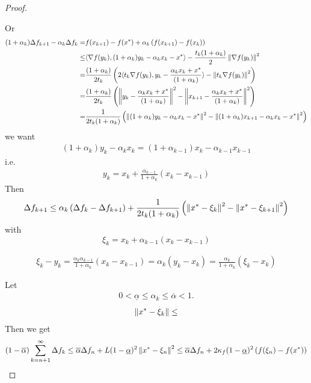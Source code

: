 \documentclass[english,12pt,a4paper]{article}
\begin{document}
\begin{proof}
%
\begin{blueenv}
%
Or 
%
\begin{align*}
(1+\alpha_k) \Delta f_{k+1} -\alpha_k \Delta f_{k} =& f(x_{k+1})-f(x^*) + \alpha_k\left(  f(x_{k+1})-f(x_{k})\right)\\
\le& \langle\nabla f(y_k),(1+\alpha_k) y_{k}-\alpha_k x_k -x^*\rangle - \frac{t_k(1+\alpha_k)}{2} \left\|\nabla f(y_k)\right\|^2 \\
=& \frac{(1+\alpha_k)}{2t_k} \left( 2\langle t_k\nabla f(y_k), y_{k}-\frac{\alpha_k x_k +x^*}{(1+\alpha_k)}\rangle-\left\|t_k\nabla f(y_k)\right\|^2 \right)\\
=& \frac{(1+\alpha_k)}{2t_k} \left( \left\| y_{k}-\frac{\alpha_k x_k +x^*}{(1+\alpha_k)}\right\|^2-\left\|x_{k+1}-\frac{\alpha_k x_k +x^*}{(1+\alpha_k)}\right\|^2 \right)\\
=& \frac{1}{2t_k(1+\alpha_k)} \left( \left\| (1+\alpha_k)y_{k}-\alpha_k x_k -x^*\right\|^2-\left\|(1+\alpha_k)x_{k+1}-\alpha_k x_k -x^*\right\|^2 \right)
\end{align*}
%
we want
%
\begin{align*}
(1+\alpha_k)y_{k}-\alpha_k x_k = (1+\alpha_{k-1})x_{k}-\alpha_{k-1} x_{k-1} 
\end{align*}
%
i.e.
%
\begin{align*}
 y_{k} = x_k + \frac{\alpha_{k-1}}{1+\alpha_k}\left( x_k - x_{k-1}\right)
\end{align*}
%
Then 
%
\begin{align*}
\Delta f_{k+1} \le \alpha_k \left( \Delta f_{k} - \Delta f_{k+1}\right) +
\frac{1}{2t_k(1+\alpha_k)} \left( \left\| x^*-\xi_k \right\|^2-\left\|x^*-\xi_{k+1} \right\|^2 \right)
\end{align*}
%
with
%
\begin{equation}\label{eq:}
\xi_k = x_k + \alpha_{k-1} (x_k - x_{k-1})
\end{equation}
%

%
\begin{align*}
\xi_k -y_k = \frac{\alpha_k\alpha_{k-1} }{1+\alpha_k}\left( x_k - x_{k-1}\right) = \alpha_k (y_k-x_k)
= \frac{\alpha_k }{1+\alpha_k}(\xi_k-x_k)
\end{align*}
%


%
\end{blueenv}
%


Let
%
\begin{align*}
0 < \underline{\alpha}\le\alpha_k\le \overline{\alpha} <1.
\end{align*}
%
%
\begin{align*}
\left\|x^* - \xi_k\right\| \le 
\end{align*}
%
Then we get
%
\begin{align*}
(1-\overline{\alpha})\sum_{k=n+1}^{\infty} \Delta f_{k} \le \overline{\alpha} \Delta f_{n} + L(1-\underline{\alpha})^2\left\|x^* - \xi_n\right\|^2 \le \overline{\alpha} \Delta f_{n} + 2\kappa_f(1-\underline{\alpha})^2\left( f(\xi_n)-f(x^*)\right)
\end{align*}
\dotfill
\end{proof}
\end{document}
